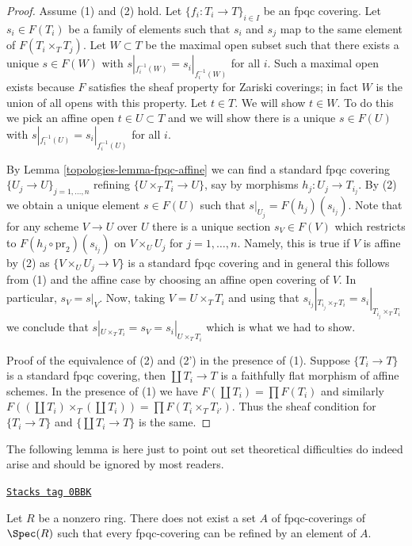 \begin{proof}

Assume (1) and (2) hold.
Let $\{f_i : T_i \to T\}_{i \in I}$ be an fpqc covering. Let $s_i \in F(T_i)$
be a family of elements such that $s_i$ and $s_j$ map to the same element
of $F(T_i \times_T T_j)$. Let $W \subset T$ be the maximal open subset
such that there exists a unique $s \in F(W)$ with
$s|_{f_i^{-1}(W)} = s_i|_{f_i^{-1}(W)}$ for all $i$.
Such a maximal open exists because $F$ satisfies the
sheaf property for Zariski coverings; in fact $W$ is the
union of all opens with this property. Let $t \in T$.
We will show $t \in W$. To do this we pick an affine open
$t \in U \subset T$ and we will show there is a unique
$s \in F(U)$ with
$s|_{f_i^{-1}(U)} = s_i|_{f_i^{-1}(U)}$ for all $i$.

\medskip\noindent
By Lemma \ref{topologies-lemma-fpqc-affine} we can find a standard fpqc covering
$\{U_j \to U\}_{j = 1, \ldots, n}$ refining $\{U \times_T T_i \to U\}$,
say by morphisms $h_j : U_j \to T_{i_j}$. By (2) we obtain a unique element
$s \in F(U)$ such that $s|_{U_j} = F(h_j)(s_{i_j})$. Note that for any
scheme $V \to U$ over $U$ there is a unique section $s_V \in F(V)$
which restricts to $F(h_j \circ \text{pr}_2)(s_{i_j})$ on
$V \times_U U_j$ for $j = 1, \ldots, n$. Namely, this is true if $V$
is affine by (2) as $\{V \times_U U_j \to V\}$ is a standard fpqc covering
and in general this follows from (1) and the affine case by choosing an
affine open covering of $V$. In particular, $s_V = s|_V$.
Now, taking $V = U \times_T T_i$ and using that
$s_{i_j}|_{T_{i_j} \times_T T_i} = s_i|_{T_{i_j} \times_T T_i}$
we conclude that $s|_{U \times_T T_i} = s_V = s_i|_{U \times_T T_i}$
which is what we had to show.

\medskip\noindent
Proof of the equivalence of (2) and (2') in the presence of (1).
Suppose $\{T_i \to T\}$ is a standard fpqc covering, then
$\coprod T_i \to T$ is a faithfully flat morphism of affine schemes.
In the presence of (1) we have $F(\coprod T_i) = \prod F(T_i)$
and similarly
$F((\coprod T_i) \times_T (\coprod T_i)) = \prod F(T_i \times_T T_{i'})$.
Thus the sheaf condition for $\{T_i \to T\}$ and $\{\coprod T_i \to T\}$
is the same.
\end{proof}

The following lemma is here just to point out set theoretical difficulties
do indeed arise and should be ignored by most readers.

\begin{lemma}
\label{topologies-lemma-no-set-of-fpqc-covers-is-initial}
\href{https://stacks.math.columbia.edu/tag/0BBK}{\texttt{Stacks tag 0BBK}}

Let $R$ be a nonzero ring. There does not exist a set $A$ of
fpqc-coverings of $\Spec(R)$ such that every fpqc-covering can
be refined by an element of $A$.
\end{lemma}

